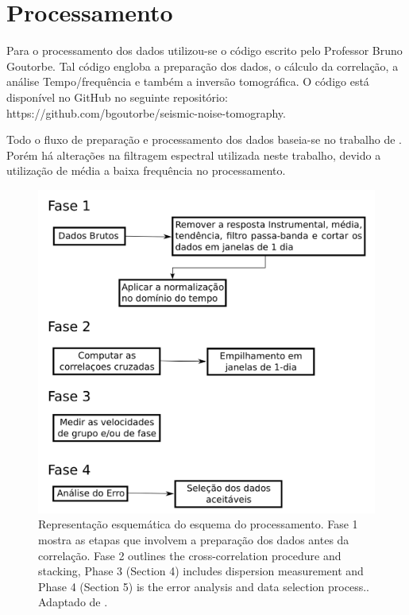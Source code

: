 \section{Processamento}

Para o processamento dos dados utilizou-se o código escrito pelo Professor Bruno Goutorbe. Tal código engloba a preparação dos dados, o cálculo da correlação, a análise Tempo/frequência e também a inversão tomográfica.  O código está disponível no GitHub no seguinte repositório: https://github.com/bgoutorbe/seismic-noise-tomography.

Todo o fluxo de preparação e processamento dos dados  baseia-se no trabalho de \cite{bensen_processing_2007}. Porém há alterações na filtragem espectral utilizada neste trabalho, devido a utilização de média a baixa frequência no processamento.


\begin{figure}[!ht]
\centering
\includegraphics[scale=0.7]{fluxograma_bensen2007.png}
\caption{Representação esquemática do esquema do processamento. Fase 1 mostra as etapas que involvem a preparação dos dados antes da correlação. Fase 2 outlines the cross-correlation procedure and stacking, Phase 3 (Section 4) includes dispersion measurement and Phase 4 (Section 5) is the error analysis and data selection process.. Adaptado de \cite{bensen_processing_2007}.}
\label{fluxograma_bensen2007}
\end{figure} 


